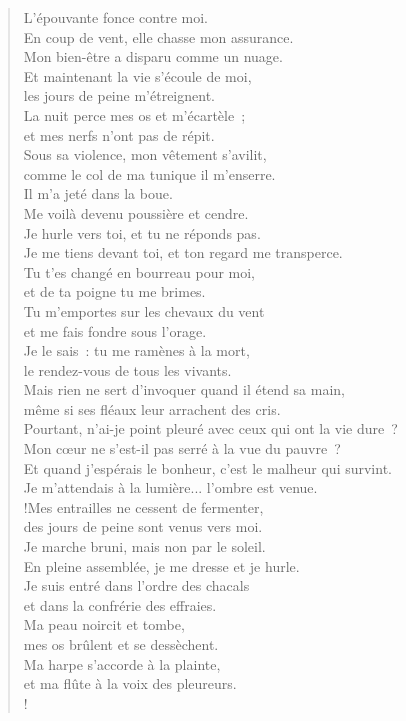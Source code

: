 \documentclass[french,twoside]{book} %
\newcommand\chapterclose{} %
\begin{document}
\begin{verse}
L’épouvante fonce contre moi. \\
En coup de vent, elle chasse mon assurance. \\
Mon bien-être a disparu comme un nuage.\\
Et maintenant la vie s’écoule de moi, \\
les jours de peine m’étreignent.\\
La nuit perce mes os et m’écartèle ; \\
et mes nerfs n’ont pas de répit.\\
Sous sa violence, mon vêtement s’avilit, \\
comme le col de ma tunique il m’enserre.\\
Il m’a jeté dans la boue. \\
Me voilà devenu poussière et cendre.\\
Je hurle vers toi, et tu ne réponds pas. \\
Je me tiens devant toi, et ton regard me transperce.\\
Tu t’es changé en bourreau pour moi, \\
et de ta poigne tu me brimes.\\
Tu m’emportes sur les chevaux du vent \\
et me fais fondre sous l’orage.\\
Je le sais : tu me ramènes à la mort, \\
le rendez-vous de tous les vivants.\\
Mais rien ne sert d’invoquer quand il étend sa main, \\
même si ses fléaux leur arrachent des cris.\\
Pourtant, n’ai-je point pleuré avec ceux qui ont la vie dure ? \\
Mon cœur ne s’est-il pas serré à la vue du pauvre ?\\
Et quand j’espérais le bonheur, c’est le malheur qui survint. \\
Je m’attendais à la lumière... l’ombre est venue.\\!Mes entrailles ne cessent de fermenter, \\
des jours de peine sont venus vers moi.\\
Je marche bruni, mais non par le soleil. \\
En pleine assemblée, je me dresse et je hurle.\\
Je suis entré dans l’ordre des chacals \\
et dans la confrérie des effraies.\\
Ma peau noircit et tombe, \\
mes os brûlent et se dessèchent.\\
Ma harpe s’accorde à la plainte, \\
et ma flûte à la voix des pleureurs.\\!
\end{verse}
\chapterclose
\end{document}
